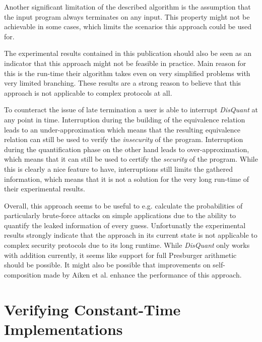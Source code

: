 \documentclass[a4paper,UKenglish]{lipics-v2018}
\begin{document}
Another significant limitation of the described algorithm is the assumption that the input program always terminates on any input. This property might not be achievable in some cases, which limits the scenarios this approach could be used for.

The experimental results contained in this publication should also be seen as an indicator that this approach might not be feasible in practice. Main reason for this is the run-time their algorithm takes even on very simplified problems with very limited branching. These results are a strong reason to believe that this approach is not applicable to complex protocols at all.
\cite{automatic_discovery_and_quantification}

To counteract the issue of late termination a user is able to interrupt \textit{DisQuant} at any point in time. Interruption during the building of the equivalence relation leads to an under-approximation which means that the resulting equivalence relation can still be used to verify the \textit{insecurity} of the program. Interruption during the quantification phase on the other hand leads to over-approximation, which means that it can still be used to certify the \textit{security} of the program. While this is clearly a nice feature to have, interruptions still limits the gathered information, which means that it is not a solution for the very long run-time of their experimental results.
\cite{automatic_discovery_and_quantification}

Overall, this approach seems to be useful to e.g. calculate the probabilities of particularly brute-force attacks on simple applications due to the ability to quantify the leaked information of every guess. Unfortunatly the experimental results strongly indicate that the approach in its current state is not applicable to complex security protocols due to its long runtime. While \textit{DisQuant} only works with addition currently, it seems like support for full Presburger  arithmetic should be possible. It might also be possible that improvements on self-composition made by Aiken et al. enhance the performance of this approach.\cite{secure_information_flow_safety}



\section{Verifying Constant-Time Implementations}
\end{document}
